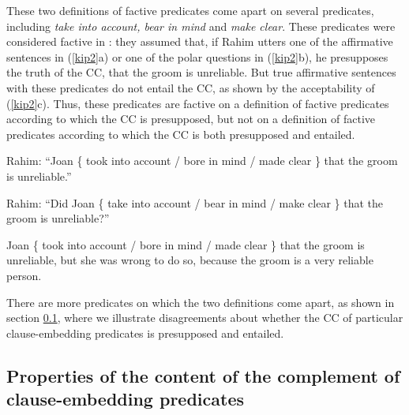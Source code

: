 \documentclass[11pt,fleqn]{article}
\newcommand{\6}{\mbox{$[\hspace*{-.6mm}[$}}
\newcommand{\9}{\mbox{$]\hspace*{-.6mm}]$}}
\begin{document}
These two definitions of factive predicates come apart on several predicates, including {\em take into account, bear in mind} and {\em make clear}. These predicates were considered factive in \citealt{kiparsky-kiparsky70}: they assumed that, if Rahim utters one of the affirmative sentences in (\ref{kip2}a) or one of the polar questions in (\ref{kip2}b), he presupposes the truth of the CC, that the groom is unreliable. But true affirmative sentences with these predicates do not entail the CC, as shown by the acceptability of (\ref{kip2}c). Thus, these predicates are factive on a definition of factive predicates according to which the CC is presupposed, but not on a definition of factive predicates according to which the CC is both presupposed and entailed.

\begin{exe}
\ex\label{kip2}
\begin{xlist}
\ex Rahim: ``Joan  \{ took into account / bore in mind / made clear \}  that the groom is unreliable.''

\ex Rahim: ``Did Joan \{ take into account / bear in mind / make clear \} that the groom is unreliable?''

\ex Joan  \{ took into account / bore in mind / made clear \} that the groom is unreliable, but she was wrong to do so, because the groom is a very reliable person.
\end{xlist}
\end{exe}
There are more predicates on which the two definitions come apart, as shown in section \ref{s12}, where we illustrate disagreements about whether the CC of particular clause-embedding predicates is presupposed and entailed.

\subsection{Properties of the content of the complement of clause-embedding predicates}\label{s12}
\end{document}
